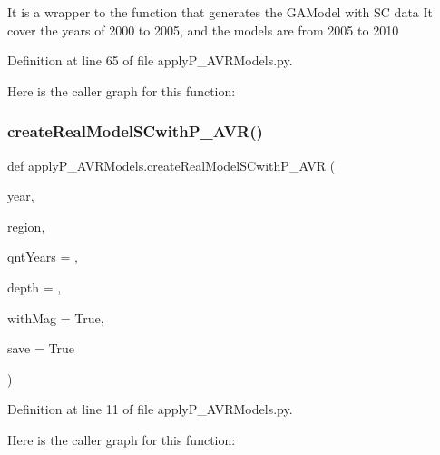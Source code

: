 \begin{DoxyVerb}It is a wrapper to the function that generates the GAModel with SC data
It cover the years of 2000 to 2005, and the models are from 2005 to 2010
\end{DoxyVerb}
 

Definition at line 65 of file apply\+P\+\_\+\+A\+V\+R\+Models.\+py.

Here is the caller graph for this function\+:
\mbox{\label{namespaceapply_p___a_v_r_models_a8ab2650b13f6aff7578147d46be67e9e}} 
\subsubsection{\texorpdfstring{create\+Real\+Model\+S\+Cwith\+P\+\_\+\+A\+V\+R()}{createRealModelSCwithP\_AVR()}}
{\footnotesize\ttfamily def apply\+P\+\_\+\+A\+V\+R\+Models.\+create\+Real\+Model\+S\+Cwith\+P\+\_\+\+A\+VR (\begin{DoxyParamCaption}\item[{}]{year,  }\item[{}]{region,  }\item[{}]{qnt\+Years = {},  }\item[{}]{depth = {},  }\item[{}]{with\+Mag = {\ttfamily True},  }\item[{}]{save = {\ttfamily True} }\end{DoxyParamCaption})}



Definition at line 11 of file apply\+P\+\_\+\+A\+V\+R\+Models.\+py.

Here is the caller graph for this function\+:
\mbox{\label{namespaceapply_p___a_v_r_models_a2f8057e000fffd5887fcd28e6134c930}} 
